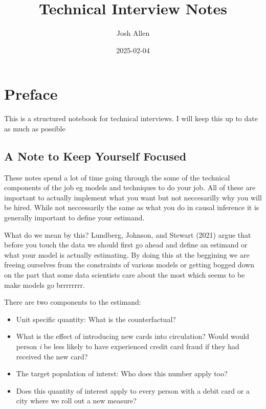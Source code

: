\documentclass[
  letterpaper,
  DIV=11,
  numbers=noendperiod]{scrreprt}
\title{Technical Interview Notes}
\author{Josh Allen}
\date{2025-02-04}
\providecommand{\tightlist}{%
  \setlength{\itemsep}{0pt}\setlength{\parskip}{0pt}}\usepackage{longtable,booktabs,array}
\renewcommand*\contentsname{Table of contents}
\newcommand\contentsname{Table of contents}
\begin{document}
\maketitle

\renewcommand*\contentsname{Table of contents}
{
\hypersetup{linkcolor=}
\setcounter{tocdepth}{2}
\tableofcontents
}


\chapter*{Preface}\label{preface}


This is a structured notebook for technical interviews. I will keep this
up to date as much as possible

\section*{A Note to Keep Yourself
Focused}\label{a-note-to-keep-yourself-focused}


These notes spend a lot of time going through the some of the technical
components of the job eg models and techniques to do your job. All of
these are important to actually implement what you want but not
neccesarilly why you will be hired. While not neccessarily the same as
what you do in causal inference it is generally important to define your
estimand.

What do we mean by this? Lundberg, Johnson, and Stewart (2021) argue
that before you touch the data we should first go ahead and define an
estimand or what your model is actually estimating. By doing this at the
beggining we are freeing ourselves from the constraints of various
models or getting bogged down on the part that some data scientists care
about the most which seems to be make models go brrrrrrrr.

There are two components to the estimand:

\begin{itemize}
\tightlist
\item
  Unit specific quantity: What is the counterfactual?
\item
  What is the effect of introducing new cards into circulation? Would
  would person \emph{i} be less likely to have experienced credit card
  fraud if they had received the new card?
\item
  The target population of interst: Who does this number apply too?
\item
  Does this quantity of interest apply to every person with a debit card
  or a city where we roll out a new measure?
\end{itemize}
\end{document}
